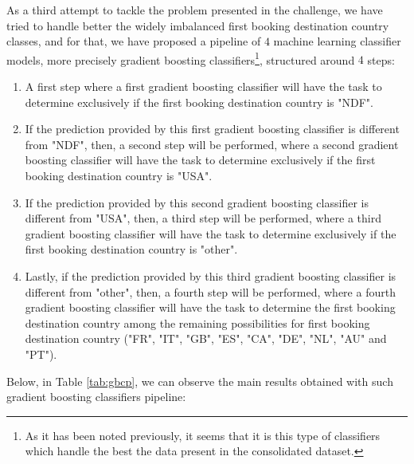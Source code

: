\documentclass[twocolumn, switch]{article}
\begin{document}
As a third attempt to tackle the problem presented in the challenge, we have tried to handle better the widely imbalanced first booking destination country classes, and for that, we have proposed a pipeline of $4$ machine learning classifier models, more precisely gradient boosting classifiers\footnote{As it has been noted previously, it seems that it is this type of classifiers which handle the best the data present in the consolidated dataset.}, structured around $4$ steps:
\begin{enumerate}
\item A first step where a first gradient boosting classifier will have the task to determine exclusively if the first booking destination country is "NDF".
\item If the prediction provided by this first gradient boosting classifier is different from "NDF", then, a second step will be performed, where a second gradient boosting classifier will have the task to determine exclusively if the first booking destination country is "USA".
\item If the prediction provided by this second gradient boosting classifier is different from "USA", then, a third step will be performed, where a third gradient boosting classifier will have the task to determine exclusively if the first booking destination country is "other".
\item Lastly, if the prediction provided by this third gradient boosting classifier is different from "other", then, a fourth step will be performed, where a fourth gradient boosting classifier will have the task to determine the first booking destination country among the remaining possibilities for first booking destination country ("FR", "IT", "GB", "ES", "CA", "DE", "NL", "AU" and "PT").
\end{enumerate}

Below, in Table \ref{tab:gbcp}, we can observe the main results obtained with such gradient boosting classifiers pipeline:
\end{document}
